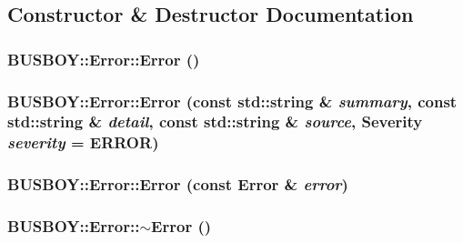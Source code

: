 \subsection{Constructor \& Destructor Documentation}
\hypertarget{classBUSBOY_1_1Error_a588193adec1a3a5ce26f73856cd2753e}{
\subsubsection[{Error}]{\setlength{\rightskip}{0pt plus 5cm}BUSBOY::Error::Error ()}}
\label{classBUSBOY_1_1Error_a588193adec1a3a5ce26f73856cd2753e}
\hypertarget{classBUSBOY_1_1Error_a941ea77fb5671d771b72f5f1cdb4af09}{
\subsubsection[{Error}]{\setlength{\rightskip}{0pt plus 5cm}BUSBOY::Error::Error (const std::string \& {\em summary}, \/  const std::string \& {\em detail}, \/  const std::string \& {\em source}, \/  {\bf Severity} {\em severity} = {\ttfamily ERROR})}}
\label{classBUSBOY_1_1Error_a941ea77fb5671d771b72f5f1cdb4af09}
\hypertarget{classBUSBOY_1_1Error_a2ed3c49cd05ad39e96353c09a8b2cc00}{
\subsubsection[{Error}]{\setlength{\rightskip}{0pt plus 5cm}BUSBOY::Error::Error (const {\bf Error} \& {\em error})}}
\label{classBUSBOY_1_1Error_a2ed3c49cd05ad39e96353c09a8b2cc00}
\hypertarget{classBUSBOY_1_1Error_a8ac9fe86b42f46a9fd90b33cb27e4a8d}{
\subsubsection[{$\sim$Error}]{\setlength{\rightskip}{0pt plus 5cm}BUSBOY::Error::$\sim$Error ()}}
\label{classBUSBOY_1_1Error_a8ac9fe86b42f46a9fd90b33cb27e4a8d}


